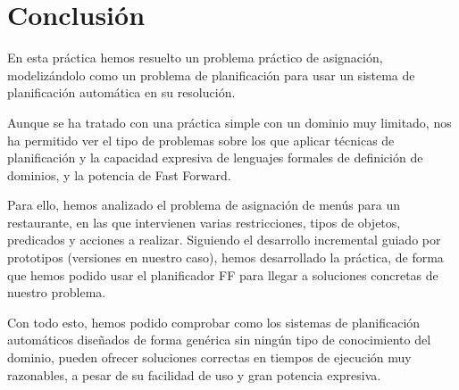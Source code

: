\documentclass{article}
\begin{document}
\section{Conclusión}
En esta práctica hemos resuelto un problema práctico de asignación, modelizándolo como un problema de planificación para usar un sistema de planificación automática en su resolución.
\par
Aunque se ha tratado con una práctica simple con un dominio muy limitado, nos ha permitido ver el tipo de problemas sobre los que aplicar técnicas de planificación y la capacidad expresiva de lenguajes formales de definición de dominios, y la potencia de Fast Forward.
\par
Para ello, hemos analizado el problema de asignación de menús para un restaurante, en las que intervienen varias restricciones, tipos de objetos, predicados y acciones a realizar. Siguiendo el desarrollo incremental guiado por prototipos (versiones en nuestro caso), hemos desarrollado la práctica, de forma que hemos podido usar el planificador FF para llegar a soluciones concretas de nuestro problema.
\par
Con todo esto, hemos podido comprobar como los sistemas de planificación automáticos diseñados de forma genérica sin ningún tipo de conocimiento del dominio, pueden ofrecer soluciones correctas en tiempos de ejecución muy razonables, a pesar de su facilidad de uso y gran potencia expresiva.
\end{document}
